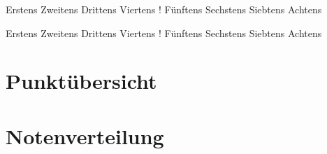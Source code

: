 \documentclass[a4paper]{scrartcl}
\begin{document}
\begin{aufgabe}
    \begin{mcumgebung}
        \choice Erstens
        \choice Zweitens
        \choice Drittens
        \choice[\mcrichtig] Viertens
        \choice! Fünftens
        \choice[\mcrichtig] Sechstens
        \choice Siebtens
        \choice[\mcrichtig] Achtens
    \end{mcumgebung}

    \begin{loesung}
        \begin{mcumgebung}
            \choice Erstens
            \choice Zweitens
            \choice Drittens
            \choice[\mcrichtig] Viertens
            \choice! Fünftens
            \choice[\mcrichtig] Sechstens
            \choice Siebtens
            \choice[\mcrichtig] Achtens
        \end{mcumgebung}
    \end{loesung}
\end{aufgabe}

\section*{Punktübersicht}
    \punktuebersicht

\section*{Notenverteilung}
    \notenverteilung
\end{document}
